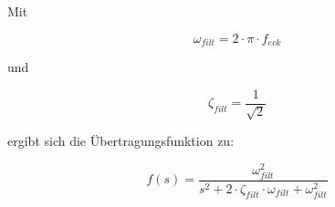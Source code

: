 Mit

\begin{equation}
	\omega_{filt} = 2 \cdot \pi \cdot f_{eck}
\end{equation}

und

\begin{equation}
	\zeta_{filt} = \frac{1}{\sqrt{2}}
\end{equation}

ergibt sich die Übertragungsfunktion zu:

\begin{equation}
	f(s) = \frac{\omega_{filt}^2}{s^2+2 \cdot \zeta_{filt} \cdot \omega_{filt} +\omega_{filt}^2}
\end{equation}